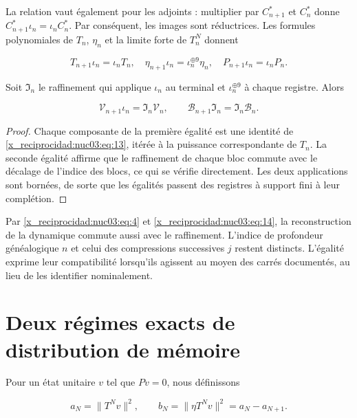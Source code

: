 La relation vaut également pour les adjoints : multiplier par \(C_{n+1}^*\) et \(C_n^*\) donne \(C_{n+1}^*\iota_n=\iota_nC_n^*\). Par conséquent, les images sont réductrices. Les formules polynomiales de \(T_n\), \(\eta_n\) et la limite forte de \(T_n^N\) donnent

\begin{equation}
T_{n+1}\iota_n=\iota_nT_n,\quad
\eta_{n+1}\iota_n=\iota_n^{\oplus9}\eta_n,\quad
P_{n+1}\iota_n=\iota_nP_n.
\label{x_reciprocidad:nuc03:eq:13}
\end{equation}

Soit \(\mathfrak I_n\) le raffinement qui applique \(\iota_n\) au terminal et \(\iota_n^{\oplus9}\) à chaque registre. Alors

\begin{equation}
\boxed{\mathcal V_{n+1}\iota_n=\mathfrak I_n\mathcal V_n,\qquad
\mathcal B_{n+1}\mathfrak I_n=\mathfrak I_n\mathcal B_n.}
\label{x_reciprocidad:nuc03:eq:14}
\end{equation}

\begin{proof}
Chaque composante de la première égalité est une identité de \eqref{x_reciprocidad:nuc03:eq:13}, itérée à la puissance correspondante de \(T_n\). La seconde égalité affirme que le raffinement de chaque bloc commute avec le décalage de l’indice des blocs, ce qui se vérifie directement. Les deux applications sont bornées, de sorte que les égalités passent des registres à support fini à leur complétion.
\end{proof}

Par \eqref{x_reciprocidad:nuc03:eq:4} et \eqref{x_reciprocidad:nuc03:eq:14}, la reconstruction de la dynamique commute aussi avec le raffinement. L’indice de profondeur généalogique \(n\) et celui des compressions successives \(j\) restent distincts. L’égalité exprime leur compatibilité lorsqu’ils agissent au moyen des carrés documentés, au lieu de les identifier nominalement.

\section{Deux régimes exacts de distribution de mémoire}

Pour un état unitaire \(v\) tel que \(Pv=0\), nous définissons

\begin{equation}
a_N=\|T^Nv\|^2,\qquad b_N=\|\eta T^Nv\|^2=a_N-a_{N+1}.
\label{x_reciprocidad:nuc03:eq:15}
\end{equation}

